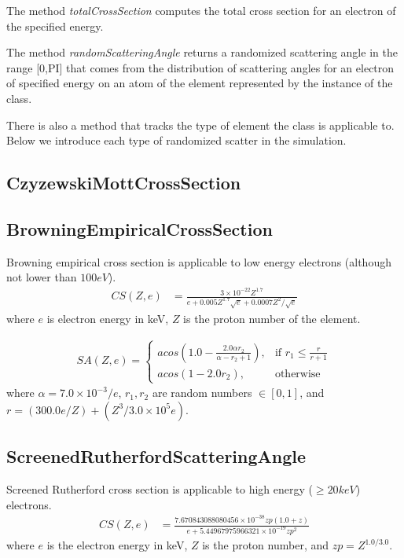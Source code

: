 The method \textit{totalCrossSection} computes the total cross section for an electron of the specified energy.

The method \textit{randomScatteringAngle} returns a randomized scattering angle in the range [0,PI] that comes from the distribution of scattering angles for an electron of specified energy on an atom of the element represented by the instance of the class.

There is also a method that tracks the type of element the class is applicable to. Below we introduce each type of randomized scatter in the simulation.

\subsection{CzyzewskiMottCrossSection}
\subsection{BrowningEmpiricalCrossSection}
Browning empirical cross section is applicable to low energy electrons (although not lower than $100eV$). 
\begin{align*}
   CS(Z, e) &= \frac{3\times 10^{-22} Z^{1.7}}{e + 0.005 Z^{1.7} \sqrt{e} + 0.0007 Z^{2} / \sqrt{e}}
\end{align*}
where $e$ is electron energy in keV, $Z$ is the proton number of the element.

\begin{align*}
    SA(Z, e)= 
\begin{cases}
    acos\left (1.0 - \frac{2.0 \alpha r_2}{\alpha - r_2 + 1}\right ),& \text{if } r_1 \leq \frac{r}{r+1}\\
    acos(1-2.0r_2),& \text{otherwise}
\end{cases}
\end{align*}
where $\alpha = 7.0\times 10^{-3}/e$, $r_1, r_2$ are random numbers $\in [0, 1]$, and $r = (300.0 e / Z) + (Z^3 / 3.0\times 10^5 e)$.

\subsection{ScreenedRutherfordScatteringAngle}
Screened Rutherford cross section is applicable to high energy ($\geq 20keV$) electrons. 
\begin{align*}
   CS(Z, e) &= \frac{7.670843088080456\times 10^{-38} zp (1.0 + z)}{e + 5.44967975966321\times 10^{-19} zp^2}
\end{align*}
where $e$ is the electron energy in keV, $Z$ is the proton number, and $zp = Z^{1.0/3.0}$.

